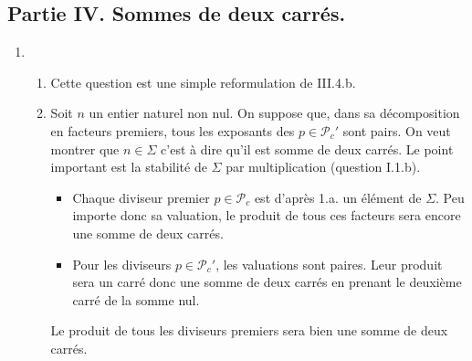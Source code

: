 \subsection*{Partie IV. Sommes de deux carrés.}
\begin{enumerate}
\item 
\begin{enumerate}
  \item Cette question est une simple reformulation de III.4.b.
  \item Soit $n$ un entier naturel non nul. On suppose que, dans sa décomposition en facteurs premiers, tous les exposants des $p\in \mathcal{P}_{c}'$ sont pairs. On veut montrer que $n\in \Sigma$ c'est à dire qu'il est somme de deux carrés.\newline
  Le point important est la stabilité de $\Sigma$ par multiplication (question I.1.b).
\begin{itemize}
  \item Chaque diviseur premier $p\in \mathcal{P}_c$ est d'après 1.a. un élément de $\Sigma$. Peu importe donc sa valuation, le produit de tous ces facteurs sera encore une somme de deux carrés.
  \item Pour les diviseurs $p\in \mathcal{P}_c'$, les valuations sont paires. Leur produit sera un carré donc une somme de deux carrés en prenant le deuxième carré de la somme nul.
\end{itemize}
Le produit de tous les diviseurs premiers sera bien une somme de deux carrés.
\end{enumerate}
  

\end{enumerate}
